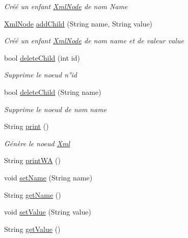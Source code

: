 \begin{DoxyCompactItemize}
\begin{DoxyCompactList}\small\item\em Créé un enfant \mbox{\hyperlink{class_n_t_k_1_1_i_o_1_1_xml_1_1_xml_node}{Xml\+Node}} de nom Name \end{DoxyCompactList}\item 
\mbox{\hyperlink{class_n_t_k_1_1_i_o_1_1_xml_1_1_xml_node}{Xml\+Node}} \mbox{\hyperlink{class_n_t_k_1_1_i_o_1_1_xml_1_1_xml_node_a7e8e593c8aea167a097f1697130e49e8}{add\+Child}} (String name, String value)
\begin{DoxyCompactList}\small\item\em Créé un enfant \mbox{\hyperlink{class_n_t_k_1_1_i_o_1_1_xml_1_1_xml_node}{Xml\+Node}} de nom name et de valeur value \end{DoxyCompactList}\item 
bool \mbox{\hyperlink{class_n_t_k_1_1_i_o_1_1_xml_1_1_xml_node_ae22a0c9309de6208e60d442c21d83ff3}{delete\+Child}} (int id)
\begin{DoxyCompactList}\small\item\em Supprime le noeud n°id \end{DoxyCompactList}\item 
bool \mbox{\hyperlink{class_n_t_k_1_1_i_o_1_1_xml_1_1_xml_node_a03a39fffd178b928c0eef6623f4ef7ed}{delete\+Child}} (String name)
\begin{DoxyCompactList}\small\item\em Supprime le noeud de nom name \end{DoxyCompactList}\item 
String \mbox{\hyperlink{class_n_t_k_1_1_i_o_1_1_xml_1_1_xml_node_a3137f191be2c138aaef2d9fee34beb82}{print}} ()
\begin{DoxyCompactList}\small\item\em Génère le noeud \mbox{\hyperlink{namespace_n_t_k_1_1_i_o_1_1_xml}{Xml}} \end{DoxyCompactList}\item 
String \mbox{\hyperlink{class_n_t_k_1_1_i_o_1_1_xml_1_1_xml_node_ae4162e1ca72beef9ba589e3572cc1e33}{print\+WA}} ()
\item 
void \mbox{\hyperlink{class_n_t_k_1_1_i_o_1_1_xml_1_1_xml_node_a3111f4432fb3cda300c350ae39ef9464}{set\+Name}} (String name)
\item 
String \mbox{\hyperlink{class_n_t_k_1_1_i_o_1_1_xml_1_1_xml_node_adbc72743b3e565f5d537a4acc30886a6}{get\+Name}} ()
\item 
void \mbox{\hyperlink{class_n_t_k_1_1_i_o_1_1_xml_1_1_xml_node_ab64ccf1caa131653a4f62810a3e82c9e}{set\+Value}} (String value)
\item 
String \mbox{\hyperlink{class_n_t_k_1_1_i_o_1_1_xml_1_1_xml_node_afec7f764cd63abfc5cd76284604878dd}{get\+Value}} ()
\end{DoxyCompactItemize}
